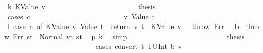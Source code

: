 \begin{isabellebody}
\ k{}{\isacharcolon}{\kern0pt}\ {\isacharparenleft}{\kern0pt}KValue\ v{\isacharparenright}{\kern0pt}\isanewline
\ \ \ \ \ \ \ \ \ \ \ \ \ \ \ \ \ \ \ \ \ \ \isamarkupfalse%
\ \isamarkupfalse%
\ {\isacharquery}{\kern0pt}thesis\isanewline
\ \ \ \ \ \ \ \ \ \ \ \ \ \ \ \ \ \ \ \ \ \ \isamarkupfalse%
\ {\isacharparenleft}{\kern0pt}cases\ c{\isacharparenright}{\kern0pt}\isanewline
\ \ \ \ \ \ \ \ \ \ \ \ \ \ \ \ \ \ \ \ \ \ \ \ \isamarkupfalse%
\ v{}{\isacharcolon}{\kern0pt}\ {\isacharparenleft}{\kern0pt}Value\ t{\isacharparenright}{\kern0pt}\isanewline
\ \ \ \ \ \ \ \ \ \ \ \ \ \ \ \ \ \ \ \ \ \ \ \ \isamarkupfalse%
\ \isamarkupfalse%
\ l{}{\isacharcolon}{\kern0pt}\ {\isachardoublequoteopen}{\isacharparenleft}{\kern0pt}case\ a{}\ of\ {\isacharparenleft}{\kern0pt}KValue\ v{\isacharcomma}{\kern0pt}\ Value\ t{\isacharparenright}{\kern0pt}\ {\isasymRightarrow}\ return\ {\isacharparenleft}{\kern0pt}v{\isacharcomma}{\kern0pt}\ t{\isacharparenright}{\kern0pt}\ {\isacharbar}{\kern0pt}\ {\isacharparenleft}{\kern0pt}KValue\ v{\isacharcomma}{\kern0pt}\ {\isacharunderscore}{\kern0pt}{\isacharparenright}{\kern0pt}\ {\isasymRightarrow}\ throw\ Err\ {\isacharbar}{\kern0pt}\ {\isacharparenleft}{\kern0pt}{\isacharunderscore}{\kern0pt}{\isacharcomma}{\kern0pt}\ b{\isacharparenright}{\kern0pt}\ {\isasymRightarrow}\ throw\ Err{\isacharparenright}{\kern0pt}\ st{\isacharprime}{\kern0pt}{\isacharprime}{\kern0pt}{\isacharprime}{\kern0pt}\ {\isacharequal}{\kern0pt}\ Normal\ {\isacharparenleft}{\kern0pt}{\isacharparenleft}{\kern0pt}v{\isacharcomma}{\kern0pt}t{\isacharparenright}{\kern0pt}{\isacharcomma}{\kern0pt}\ st{\isacharprime}{\kern0pt}{\isacharprime}{\kern0pt}{\isacharprime}{\kern0pt}{\isacharparenright}{\kern0pt}{\isachardoublequoteclose}\ \isamarkupfalse%
\ p{}\ k{}\ \isamarkupfalse%
\ simp\isanewline
\ \ \ \ \ \ \ \ \ \ \ \ \ \ \ \ \ \ \ \ \ \ \ \ \isamarkupfalse%
\ \isamarkupfalse%
\ {\isacharquery}{\kern0pt}thesis\isanewline
\ \ \ \ \ \ \ \ \ \ \ \ \ \ \ \ \ \ \ \ \ \ \ \ \isamarkupfalse%
\ {\isacharparenleft}{\kern0pt}cases\ {\isachardoublequoteopen}convert\ t\ {\isacharparenleft}{\kern0pt}TUInt\ b{}{}{}{\isacharparenright}{\kern0pt}\ v{\isachardoublequoteclose}{\isacharparenright}{\kern0pt}\isanewline
\ \ \ \ \ \ \ \ \ \ \ \ \ \ \ \ \ \ \ \ \ \ \ \ \ \ \isamarkupfalse%

\end{isabellebody}
